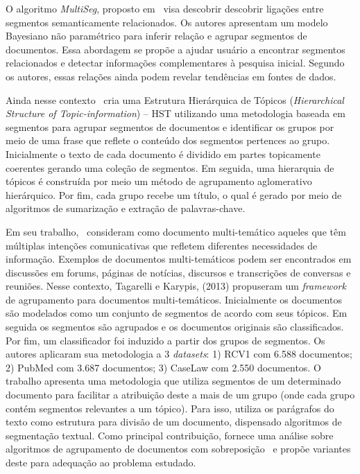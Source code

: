 O algoritmo \textit{MultiSeg}, proposto em~\cite{Jeong:2010} visa descobrir descobrir ligações entre segmentos semanticamente relacionados. Os autores apresentam um modelo Bayesiano não paramétrico para inferir relação e agrupar segmentos de documentos. Essa abordagem se propõe a ajudar usuário a encontrar segmentos relacionados e detectar informações complementares à pesquisa inicial. Segundo os autores, essas relações ainda podem revelar tendências em fontes de dados.



Ainda nesse contexto~\cite{Cuong2011} cria uma Estrutura Hierárquica de Tópicos (\textit{Hierarchical Structure of Topic-information}) -- HST utilizando uma metodologia baseada em segmentos para agrupar segmentos de documentos e identificar os grupos por meio de uma frase que reflete o conteúdo dos segmentos pertences ao grupo.
Inicialmente o texto de cada documento é dividido em partes topicamente coerentes gerando uma coleção de segmentos. Em seguida, uma hierarquia de tópicos é construída por meio um método de agrupamento aglomerativo hierárquico. Por fim, cada grupo recebe um título, o qual é gerado por meio de algoritmos de sumarização e extração de palavras-chave.


Em seu trabalho,~\cite{Tagarelli2013} consideram como documento multi-temático aqueles que têm múltiplas intenções comunicativas que refletem diferentes necessidades de informação.
Exemplos de documentos multi-temáticos podem ser encontrados em discussões em forums, páginas de notícias, discursos e transcrições de conversas e reuniões. Nesse contexto, Tagarelli e Karypis, (2013) propuseram um \textit{framework} de agrupamento para documentos multi-temáticos. %
Inicialmente os documentos são modelados como um conjunto de segmentos de acordo com seus tópicos. Em seguida os segmentos são agrupados e os documentos originais são classificados. Por fim, um classificador foi induzido a partir dos grupos de segmentos.
Os autores aplicaram sua metodologia a 3 \textit{datasets}: 1) RCV1 com 6.588 documentos; 2) PubMed com 3.687 documentos; 3) CaseLaw com 2.550 documentos. 
O trabalho apresenta uma metodologia que utiliza segmentos de um determinado documento para facilitar a atribuição deste a mais de um grupo (onde cada grupo contém segmentos relevantes a um tópico). Para isso, utiliza os parágrafos do texto como estrutura para divisão de um documento, dispensado algoritmos de segmentação textual. Como principal contribuição, fornece uma análise sobre algoritmos de agrupamento de documentos com sobreposição~\cite{Zhao2004a, Zhao2004b, Dhillon2001} e propõe variantes deste para adequação ao problema estudado. 

